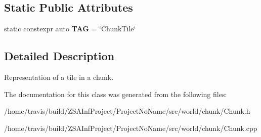 \subsection*{Static Public Attributes}
\begin{DoxyCompactItemize}
\item 
\hypertarget{classChunkTile_a321f107b80df537c1d2abbe36bf13df1}{static constexpr auto {\bfseries T\-A\-G} = \char`\"{}Chunk\-Tile\char`\"{}}\label{classChunkTile_a321f107b80df537c1d2abbe36bf13df1}

\end{DoxyCompactItemize}


\subsection{Detailed Description}
Representation of a tile in a chunk. 

The documentation for this class was generated from the following files\-:\begin{DoxyCompactItemize}
\item 
/home/travis/build/\-Z\-S\-A\-Inf\-Project/\-Project\-No\-Name/src/world/chunk/Chunk.\-h\item 
/home/travis/build/\-Z\-S\-A\-Inf\-Project/\-Project\-No\-Name/src/world/chunk/Chunk.\-cpp\end{DoxyCompactItemize}
